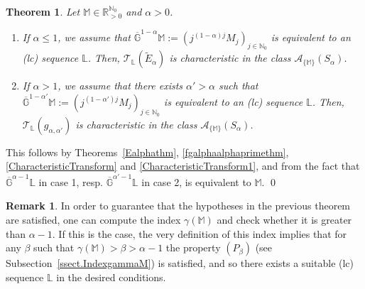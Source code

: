 \documentclass[11pt,a4paper]{article}
\theoremstyle{plain}
\newtheorem{theorem}[proposition]{Theorem}
\theoremstyle{definition}
\newtheorem{remark}[proposition]{Remark}
\newcommand{\RR}{\mathbb{R}}
\newcommand{\NN}{\mathbb{N}}
\newcommand{\red}[1]{{\color{red}#1}}
\newcommand{\M}{\mathbb{M}}
\newcommand{\LL}{\mathbb{L}}
\newcommand{\G}{\mathbb{G}}
\def\a{\alpha}
\begin{document}


\begin{theorem}\label{mainTthm2}
	Let $\M\in\RR_{>0}^{\NN_0}$ and $\alpha>0$.
	\begin{enumerate}
		\item If $\alpha\le 1$, we assume that  $\overline{\G}^{1-\alpha}\M:=(j^{(1-\alpha)j}M_j)_{j\in\NN_0}$
	is equivalent to an (lc) sequence $\LL$. Then, $\mathcal{T}_{\LL} (\widetilde{E}_{\alpha}) $ is characteristic in the class $\mathcal{A}_{\{\M\}} (S_{\alpha})$.
		\item If $\alpha>1$, we assume that there exists $\a'>\a$ such that $\overline{\G}^{1-\alpha'}\M:=(j^{(1-\alpha')j}M_j)_{j\in\NN_0}$
	is equivalent to an (lc) sequence $\LL$. Then, $\mathcal{T}_{\LL} (g_{\alpha,\alpha'}) $ is characteristic in the class $\mathcal{A}_{\{\M\}} (S_{\alpha})$.
	\end{enumerate}
\end{theorem}

This follows by Theorems~\ref{Ealphathm}, \ref{fgalphaalphaprimethm},  \ref{CharacteristicTransform} and \ref{CharacteristicTransform1}, and  from the fact that $\overline{\G}^{\alpha-1}\LL$ in case 1, resp. $\overline{\G}^{\alpha'-1}\LL$ in case 2, is equivalent to $\M$.
\qed\enddemo

\begin{remark}\label{rem.gammaindexcharactfunct}
In order to guarantee that the hypotheses in the previous theorem are satisfied, one can compute the index $\gamma(\M)$ and check whether it is greater than $\a-1$. If this is the case, the very definition of this index implies that for {any $\beta$ such that $\gamma(\M)>\beta>\a-1$ the property $\left(P_{\beta}\right)$} (see Subsection~\ref{ssect.IndexgammaM}) is satisfied, and so there exists a suitable  (lc) sequence $\LL$ in the desired conditions.
\end{remark}
\end{document}
